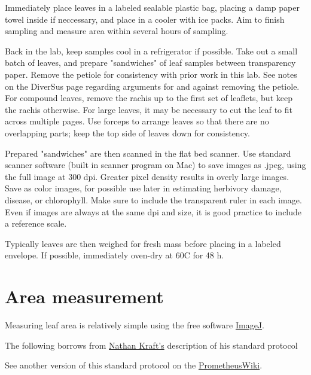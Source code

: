 \documentclass[11pt]{article}
\begin{document}
Immediately place leaves in a labeled sealable plastic bag, placing a damp paper towel inside if neccessary, and place in a cooler with ice packs. Aim to finish sampling and measure area within several hours of sampling. 

Back in the lab, keep samples cool in a refrigerator if possible. Take out a small batch of leaves, and prepare "sandwiches" of leaf samples between transparency paper. Remove the petiole for consistency with prior work in this lab. See notes on the DiverSus page regarding arguments for and against removing the petiole. For compound leaves, remove the rachis up to the first set of leaflets, but keep the rachis otherwise. For large leaves, it may be necessary to cut the leaf to fit across multiple pages. Use forceps to arrange leaves so that there are no overlapping parts; keep the top side of leaves down for consistency.

Prepared "sandwiches" are then scanned in the flat bed scanner. Use standard scanner software (built in scanner program on Mac) to save images as .jpeg, using the full image at 300 dpi. Greater pixel density results in overly large images. Save as color images, for possible use later in estimating herbivory damage, disease, or chlorophyll. Make sure to include the transparent ruler in each image. Even if images are always at the same dpi and size, it is good practice to include a reference scale.

Typically leaves are then weighed for fresh mass before placing in a labeled envelope. If possible, immediately oven-dry at 60\degree C for 48 h.

\section*{Area measurement}

Measuring leaf area is relatively simple using the free software \href{https://imagej.nih.gov/ij/download.html}{ImageJ}.

The following borrows from \href{http://www.zoology.ubc.ca/~rieseberg/RiesebergResources/wp-content/uploads/2012/01/Leaf-Image-Protocol_NKraft.pdf}{Nathan Kraft's} description of his standard protocol

See another version of this standard protocol on the \href{http://prometheuswiki.publish.csiro.au/tiki-index.php?%20page=Measuring+leaf+perimeter+and+leaf+area}{PrometheusWiki}.
\end{document}
